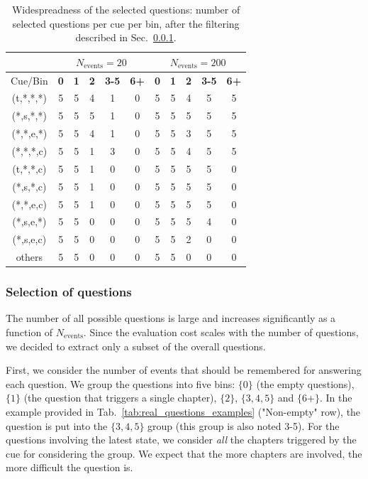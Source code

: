 \documentclass{article}
\begin{document}
\begin{table}[h]
\centering
\caption{Widespreadness of the selected questions: number of selected questions per cue per bin, after the filtering described in Sec.~\ref{app:question_select_widespread}.}
\label{tab:question_select_widespread}
\begin{scriptsize}
\begin{tabular}{@{}ccccccccccc@{}}
\toprule
 & \multicolumn{5}{c}{$N_{\text{events}} = 20$} & \multicolumn{5}{c}{$N_{\text{events}} = 200$} \\ \midrule
Cue/Bin & \textbf{0} & \textbf{1} & \textbf{2} & \textbf{3-5} & \textbf{6+} & \textbf{0} & \textbf{1} & \textbf{2} & \textbf{3-5} & \textbf{6+} \\
(t,*,*,*) & 5 & 5 & 4 & 1 & 0 & 5 & 5 & 4 & 5 & 5 \\
(*,s,*,*) & 5 & 5 & 5 & 1 & 0 & 5 & 5 & 5 & 5 & 5 \\
(*,*,e,*) & 5 & 5 & 4 & 1 & 0 & 5 & 5 & 3 & 5 & 5 \\
(*,*,*,c) & 5 & 5 & 1 & 3 & 0 & 5 & 5 & 4 & 5 & 5 \\
(t,*,*,c) & 5 & 5 & 1 & 0 & 0 & 5 & 5 & 5 & 5 & 0 \\
(*,s,*,c) & 5 & 5 & 1 & 0 & 0 & 5 & 5 & 5 & 5 & 0 \\
(*,*,e,c) & 5 & 5 & 1 & 0 & 0 & 5 & 5 & 5 & 5 & 0 \\
(*,s,e,*) & 5 & 5 & 0 & 0 & 0 & 5 & 5 & 5 & 4 & 0 \\
(*,s,e,c) & 5 & 5 & 0 & 0 & 0 & 5 & 5 & 2 & 0 & 0 \\
others & 5 & 5 & 0 & 0 & 0 & 5 & 5 & 0 & 0 & 0 \\ \bottomrule
\end{tabular}
\end{scriptsize}
\end{table}

\subsubsection{Selection of questions}\label{app:question_select_widespread}



The number of all possible questions is large and increases significantly as a function of $N_{\text{events}}$. 
Since the evaluation cost scales with the number of questions, we decided to extract only a subset of the overall questions.

First, we consider the number of events that should be remembered for answering each question. We group the questions into five bins: $\lbrace 0 \rbrace $ (the empty questions), $\lbrace  1 \rbrace$ (the question that triggers a single chapter), $\lbrace  2 \rbrace$, $\lbrace 3,4,5 \rbrace$ and $\lbrace 6+ \rbrace$. In the example provided in Tab.~\ref{tab:real_questions_examples} ("Non-empty" row), the question is put into the $\lbrace 3,4,5 \rbrace$ group (this group is also noted 3-5). For the questions involving the latest state, we consider \emph{all} the chapters triggered by the cue for considering the group. We expect that the more chapters are involved, the more difficult the question is.
\end{document}
